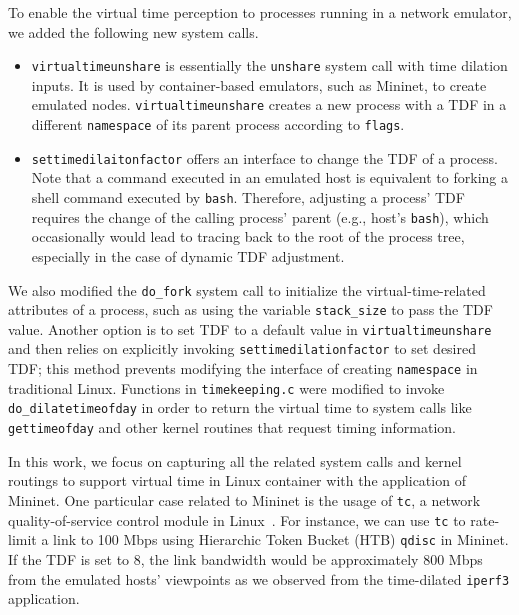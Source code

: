 To enable the virtual time perception to processes running in a network emulator, we added the following new system calls.
\begin{itemize}
    \item \texttt{virtualtimeunshare} is essentially the \texttt{unshare} system call with time dilation inputs.
        It is used by container-based emulators, such as Mininet, to create emulated nodes.
        \texttt{virtualtimeunshare} creates a new process with a TDF in a different \texttt{namespace} of its parent process according to \texttt{flags}.
    \item \texttt{settimedilaitonfactor} offers an interface to change the TDF of a process.
        Note that a command executed in an emulated host is equivalent to forking a shell command executed by \texttt{bash}. 
        Therefore, adjusting a process' TDF requires the change of the calling process' parent (e.g., host's \texttt{bash}),
        which occasionally would lead to tracing back to the root of the process tree, especially in the case of dynamic TDF adjustment. 
\end{itemize}

We also modified the \texttt{do\_fork} system call to initialize the virtual-time-related attributes of a process,
such as using the variable \texttt{stack\_size} to pass the TDF value. 
Another option is to set TDF to a default value in \texttt{virtualtimeunshare} and
then relies on explicitly invoking \texttt{settimedilationfactor} to set desired TDF;
this method prevents modifying the interface of creating \texttt{namespace} in traditional Linux. 
Functions in \texttt{timekeeping.c} were modified to invoke \texttt{do\_dilatetimeofday}
in order to return the virtual time to system calls like \texttt{gettimeofday} and other kernel routines that request timing information.


In this work, we focus on capturing all the related system calls and kernel routings to support virtual time in Linux container with the application of Mininet. 
One particular case related to Mininet is the usage of \texttt{tc}, a network quality-of-service control module in Linux~\cite{TrafficControl}. 
For instance, we can use \texttt{tc} to rate-limit a link to 100 Mbps using Hierarchic Token Bucket (HTB) \texttt{qdisc} in Mininet. If the TDF is set to 8, the link bandwidth would be approximately 800 Mbps from the emulated hosts' viewpoints as we observed from the time-dilated \texttt{iperf3} application.

